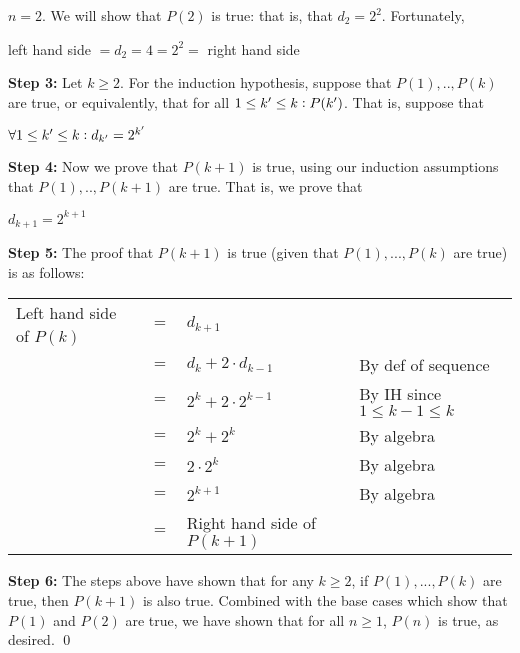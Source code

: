 \documentclass{article}
\begin{document}
$n=2$. We will show that $P(2)$ is true: that is, that $d_2=2^2$. Fortunately,

\begin{center}
	left hand side $=d_2=4=2^2=$ right hand side \\
\end{center}


\noindent\textbf{Step 3:} Let $k\geq 2$. For the induction hypothesis, suppose that $P(1),..,P(k)$ are true, or equivalently, that for all $1\leq k' \leq k\vcentcolon P(k')$. That is, suppose that 

\begin{center}
	$\forall 1\leq k'\leq k\vcentcolon d_{k'}=2^{k'}$
\end{center}
\vspace{15pt}


\noindent\textbf{Step 4:} Now we prove that $P(k+1)$ is true, using our induction assumptions that $P(1),..,P(k+1)$ are true. That is, we prove that
\begin{center}
	$d_{k+1}=2^{k+1}$ \\
\end{center}
\vspace{15pt}


\noindent\textbf{Step 5:} The proof that $P(k+1)$ is true (given that $P(1),...,P(k)$ are true) is as follows:
\vspace{5pt}

\begin{adjustwidth}{-0.25cm}{}
	\noindent
	\hspace{-3cm}
	\begin{sloppypar}
		\begin{tabular}{l l l l}
			Left hand side of $P(k)$ & $=$ & $d_{k+1}$ & \\
									 & $=$ & $d_{k}+2\cdot d_{k-1}$ & By def of sequence \\
									 & $=$ & $2^k+2\cdot 2^{k-1}$ & By IH since $1\leq k-1\leq k$\\
									 & $=$ & $2^k+2^k$ & By algebra \\
									 & $=$ & $2\cdot 2^k$ & By algebra \\
									 & $=$ & $2^{k+1}$ & By algebra \\
									 & $=$ & Right hand side of $P(k+1)$ & \\
		\end{tabular}
	\end{sloppypar}
	
\end{adjustwidth}
\vspace{15pt}

\noindent\textbf{Step 6:} The steps above have shown that for any $k\geq 2$, if $P(1),...,P(k)$ are true, then $P(k+1)$ is also true. Combined with the base cases which show that $P(1)$ and $P(2)$ are true, we have shown that for all $n\geq 1$, $P(n)$ is true, as desired. \qed
\end{document}
